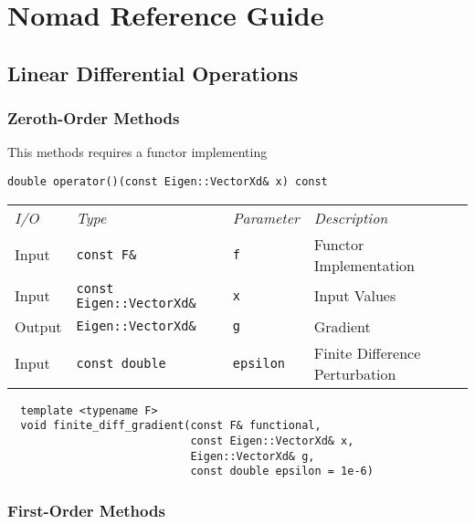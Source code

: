 \chapter{Nomad Reference Guide}

\section{Linear Differential Operations} \label{sec:differential_operations}

\subsection{Zeroth-Order Methods}

This methods requires a functor implementing
%
\begin{verbatim}
double operator()(const Eigen::VectorXd& x) const
\end{verbatim}

\begin{tcolorbox}[colback=white,colframe=gray90, coltitle=black,boxrule=3pt,
fonttitle=\bfseries,title=Finite Difference Gradient]

\begin{tabular}{llll}
\textit{I/O} & \textit{Type} & \textit{Parameter} & \textit{Description} \\
Input & \texttt{const F\&} & \texttt{f} & Functor Implementation \\
Input & \texttt{const Eigen::VectorXd\&} & \texttt{x} & Input Values \\
Output & \texttt{Eigen::VectorXd\&} & \texttt{g} & Gradient \\
Input & \texttt{const double} & \texttt{epsilon} & Finite Difference Perturbation
\end{tabular}

\vspace{5mm}

\begin{verbatim}
  template <typename F>
  void finite_diff_gradient(const F& functional,
                            const Eigen::VectorXd& x,
                            Eigen::VectorXd& g,
                            const double epsilon = 1e-6)
\end{verbatim}

\end{tcolorbox}

\subsection{First-Order Methods}

